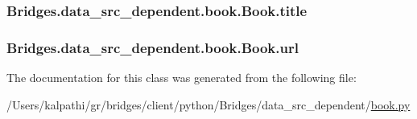 \subsubsection[{title}]{\setlength{\rightskip}{0pt plus 5cm}Bridges.\+data\+\_\+src\+\_\+dependent.\+book.\+Book.\+title}\label{class_bridges_1_1data__src__dependent_1_1book_1_1_book_a210b83d20030cb1da8e8d2a3a2279886}
\hypertarget{class_bridges_1_1data__src__dependent_1_1book_1_1_book_a243366fff7196a0f06e9dc5f4bc17b0e}{}
\subsubsection[{url}]{\setlength{\rightskip}{0pt plus 5cm}Bridges.\+data\+\_\+src\+\_\+dependent.\+book.\+Book.\+url}\label{class_bridges_1_1data__src__dependent_1_1book_1_1_book_a243366fff7196a0f06e9dc5f4bc17b0e}


The documentation for this class was generated from the following file\+:\begin{DoxyCompactItemize}
\item 
/\+Users/kalpathi/gr/bridges/client/python/\+Bridges/data\+\_\+src\+\_\+dependent/\hyperlink{book_8py}{book.\+py}\end{DoxyCompactItemize}
